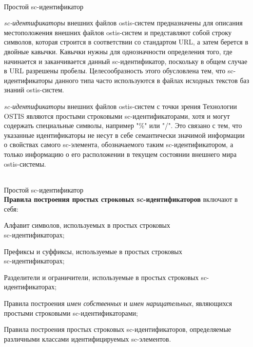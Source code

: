 \begin{frame}{\\Простой sc-идентификатор}
	\topline
	\justifying
	\vspace*{\fill}\\
	\small{
		\textit{sc-идентификаторы} внешних файлов ostis-систем предназначены для описания местоположения внешних файлов ostis-систем и представляют собой строку символов, которая строится в соответствии со стандартом URL, а затем берется в двойные кавычки. Кавычки нужны для однозначности определения того, где начинается и заканчивается данный sc-идентификатор, поскольку в общем случае в URL разрешены пробелы. Целесообразность этого обусловлена тем, что sc-идентификаторы данного типа часто используются в файлах исходных текстов баз знаний ostis-систем.
		
		\bigskip
		\textit{sc-идентификаторы} внешних файлов ostis-систем с точки зрения Технологии OSTIS являются простыми строковыми sc-идентификаторами, хотя и могут содержать специальные символы, например "\%"{} или "/"{}. Это связано с тем, что указанные идентификаторы не несут в себе семантически значимой информации о свойствах самого sc-элемента, обозначаемого таким sc-идентификатором, а только информацию о его расположении в текущем состоянии внешнего мира ostis-системы.
	}
\end{frame}

\begin{frame}{\\Простой sc-идентификатор}
	\topline
	\justifying
	\vspace*{\fill}\\
	\textbf{Правила построения простых строковых sc-идентификаторов} включают в себя:
		\begin{textitemize}
			\item Алфавит символов, используемых в простых строковых\\ sc-идентификаторах;
			\item Префиксы и суффиксы, используемые в простых строковых\\ sc-идентификаторах;
			\item Разделители и ограничители, используемые в простых строковых sc-идентификаторах;
			\item Правила построения \textit{имен собственных} и \textit{имен нарицательных}, являющихся простыми строковыми sc-идентификаторами;
			\item Правила построения простых строковых sc-идентификаторов, определяемые различными классами идентифицируемых sc-элементов.
		\end{textitemize}
\end{frame}

